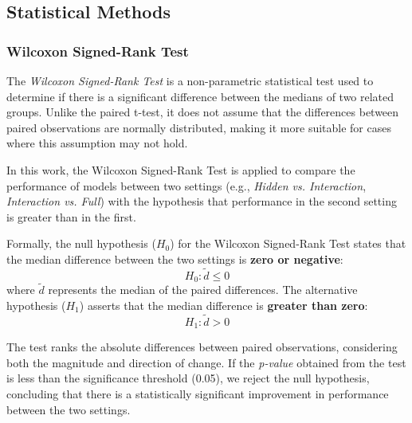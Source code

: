 \subsection{Statistical Methods}
\label{sec:StatisticalMethods}

\subsubsection{Wilcoxon Signed-Rank Test}
\label{sec:wilcoxonTest}

The \textit{Wilcoxon Signed-Rank Test} is a non-parametric statistical test used to determine if there is a significant difference between the medians of two related groups. Unlike the paired t-test, it does not assume that the differences between paired observations are normally distributed, making it more suitable for cases where this assumption may not hold.

In this work, the Wilcoxon Signed-Rank Test is applied to compare the performance of models between two settings (e.g., \textit{Hidden vs. Interaction}, \textit{Interaction vs. Full}) with the hypothesis that performance in the second setting is greater than in the first.

Formally, the null hypothesis (\(H_0\)) for the Wilcoxon Signed-Rank Test states that the median difference between the two settings is \textbf{zero or negative}:
\[
H_0: \tilde{d} \leq 0
\]
where \(\tilde{d}\) represents the median of the paired differences. The alternative hypothesis (\(H_1\)) asserts that the median difference is \textbf{greater than zero}:
\[
H_1: \tilde{d} > 0
\]

The test ranks the absolute differences between paired observations, considering both the magnitude and direction of change. If the \textit{p-value} obtained from the test is less than the significance threshold (0.05), we reject the null hypothesis, concluding that there is a statistically significant improvement in performance between the two settings.



